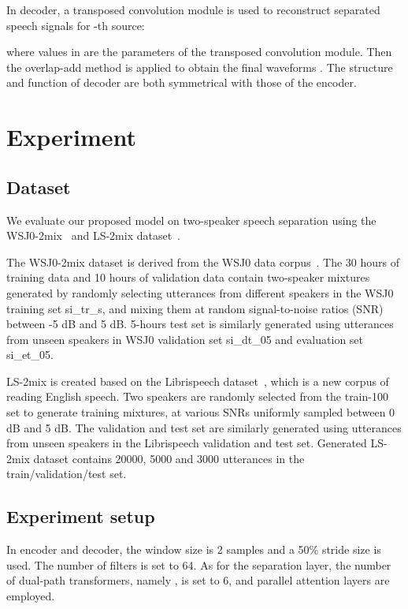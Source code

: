 \documentclass[a4paper]{article}
\begin{document}
In decoder, a transposed convolution module is used to reconstruct separated speech signals  for -th source:

where values in  are the parameters of the transposed convolution module. Then the overlap-add method is applied to obtain the final waveforms . The structure and function of decoder are both symmetrical with those of the encoder.

\section{Experiment}

\subsection{Dataset}

We evaluate our proposed model on two-speaker speech separation using the WSJ0-2mix~\cite{hershey2016deep} and LS-2mix dataset~\cite{panayotov2015librispeech}.

The WSJ0-2mix dataset is derived from the WSJ0 data corpus~\cite{garofolo1993csr}. The 30 hours of training data and 10 hours of validation data contain two-speaker mixtures generated by randomly selecting utterances from different speakers in the WSJ0 training set si\_tr\_s, and mixing them at random signal-to-noise ratios (SNR) between -5 dB and 5 dB. 5-hours test set is similarly generated using utterances from unseen speakers in WSJ0 validation set si\_dt\_05 and evaluation set si\_et\_05.


LS-2mix is created based on the Librispeech dataset~\cite{panayotov2015librispeech}, which is a new corpus of reading English speech.
Two speakers are randomly selected from the train-100 set to generate training mixtures, at various SNRs uniformly sampled between 0 dB and 5 dB. The validation and test set are similarly generated using utterances from unseen speakers in the Librispeech validation and test set. Generated LS-2mix dataset contains 20000, 5000 and 3000 utterances in the train/validation/test set.

\subsection{Experiment setup}

In encoder and decoder, the window size is 2 samples and a 50\% stride size is used. The number of filters is set to 64. As for the separation layer, the number of dual-path transformers, namely , is set to 6, and  parallel attention layers are employed.
\end{document}
